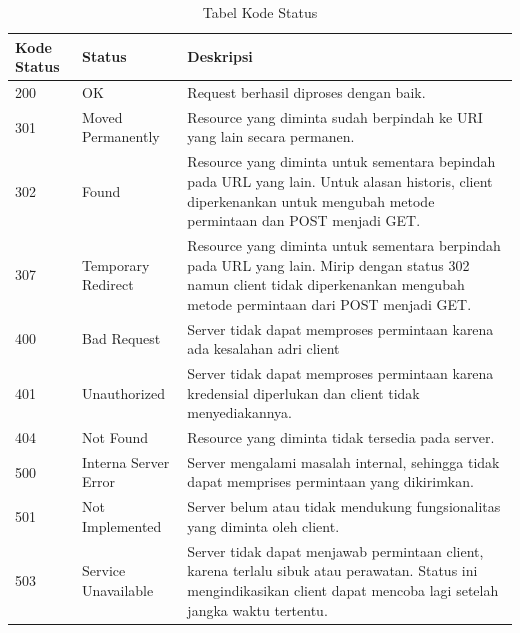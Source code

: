 \begin{table}[H]
\centering
\begin{tabular}{|p{3cm}|p{5cm}|p{5cm}|}
\hline
\textbf{Kode Status} & \textbf{Status}               & \textbf{Deskripsi}\\\hline
200         & OK                   & Request berhasil diproses dengan baik.                                                                                                                                         \\\hline
301         & Moved Permanently    & Resource yang diminta sudah berpindah ke URI yang lain secara permanen.                                                                                                        \\\hline
302         & Found                & Resource yang diminta untuk sementara bepindah pada URL yang lain. Untuk alasan historis, client diperkenankan untuk mengubah metode permintaan dan POST menjadi GET.          \\
307         & Temporary Redirect   & Resource yang diminta untuk sementara berpindah pada URL yang lain. Mirip dengan status 302 namun client tidak diperkenankan mengubah metode permintaan dari POST menjadi GET. \\\hline
400         & Bad Request          & Server tidak dapat memproses permintaan karena ada kesalahan adri client                                                                                                       \\
401         & Unauthorized         & Server tidak dapat memproses permintaan karena kredensial diperlukan dan client tidak menyediakannya.                                                                          \\\hline
404         & Not Found            & Resource yang diminta tidak tersedia pada server.                                                                                                                              \\\hline
500         & Interna Server Error & Server mengalami masalah internal, sehingga tidak dapat memprises permintaan yang dikirimkan.                                                                                  \\\hline
501         & Not Implemented      & Server belum atau tidak mendukung fungsionalitas yang diminta oleh client.                                                                                                     \\\hline
503         & Service Unavailable  & Server tidak dapat menjawab permintaan client, karena terlalu sibuk atau perawatan. Status ini mengindikasikan client dapat mencoba lagi setelah jangka waktu tertentu.  \\\hline     
\end{tabular}
\caption[Tabel Kode Status]{Tabel Kode Status}
\label{table:kodestatus}
\end{table}

